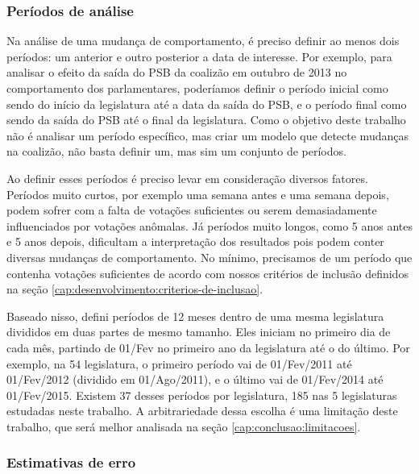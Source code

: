 \documentclass[a4paper,titlepage]{ppgi}\usepackage[]{graphicx}\usepackage[]{color}
\begin{document}
\subsubsection{Períodos de análise}
\label{cap:desenvolvimento:periodos-de-analise}

Na análise de uma mudança de comportamento, é preciso definir ao menos dois
períodos: um anterior e outro posterior a data de interesse. Por exemplo, para
analisar o efeito da saída do PSB da coalizão em outubro de 2013 no
comportamento dos parlamentares, poderíamos definir o período inicial como
sendo do início da legislatura até a data da saída do PSB, e o período final
como sendo da saída do PSB até o final da legislatura. Como o objetivo deste
trabalho não é analisar um período específico, mas criar um modelo que detecte
mudanças na coalizão, não basta definir um, mas sim um conjunto de
períodos.

Ao definir esses períodos é preciso levar em consideração diversos fatores.
Períodos muito curtos, por exemplo uma semana antes e uma semana depois, podem
sofrer com a falta de votações suficientes ou serem demasiadamente
influenciados por votações anômalas. Já períodos muito longos, como 5 anos
antes e 5 anos depois, dificultam a interpretação dos resultados pois podem
conter diversas mudanças de comportamento. No mínimo, precisamos de um período
que contenha votações suficientes de acordo com nossos critérios de inclusão
definidos na seção \ref{cap:desenvolvimento:criterios-de-inclusao}.

Baseado nisso, defini períodos de 12 meses dentro de uma mesma legislatura
divididos em duas partes de mesmo tamanho. Eles iniciam no primeiro dia de cada
mês, partindo de 01/Fev no primeiro ano da legislatura até o do último. Por
exemplo, na 54\textordfeminine{} legislatura, o primeiro período vai de
01/Fev/2011 até 01/Fev/2012 (dividido em 01/Ago/2011), e o último vai de
01/Fev/2014 até 01/Fev/2015. Existem 37 desses períodos por legislatura, 185
nas 5 legislaturas estudadas neste trabalho. A arbitrariedade dessa escolha é
uma limitação deste trabalho, que será melhor analisada na seção
\ref{cap:conclusao:limitacoes}.

\subsubsection{Estimativas de erro}
\end{document}
